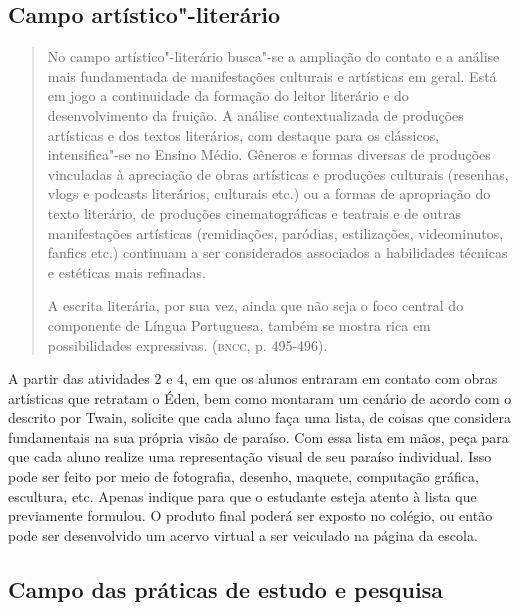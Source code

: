 \documentclass{extarticle}
\begin{document}
\subsection{Campo artístico"-literário}

\begin{quote}
No campo artístico"-literário busca"-se a ampliação do contato e a
análise mais fundamentada de manifestações culturais e artísticas em
geral. Está em jogo a continuidade da formação do leitor literário e do
desenvolvimento da fruição. A análise contextualizada de produções
artísticas e dos textos literários, com destaque para os clássicos,
intensifica"-se no Ensino Médio. Gêneros e formas diversas de produções
vinculadas à apreciação de obras artísticas e produções culturais
(resenhas, vlogs e podcasts literários, culturais etc.) ou a formas de
apropriação do texto literário, de produções cinematográficas e teatrais
e de outras manifestações artísticas (remidiações, paródias,
estilizações, videominutos, fanfics etc.) continuam a ser considerados
associados a habilidades técnicas e estéticas mais refinadas.

A escrita literária, por sua vez, ainda que não seja o foco central do
componente de Língua Portuguesa, também se mostra rica em possibilidades
expressivas. (\textsc{bncc}, p. 495-496).
\end{quote}

A partir das atividades 2 e 4, em que os alunos entraram em contato
com obras artísticas que retratam o Éden, bem como montaram um cenário
de acordo com o descrito por Twain, solicite que cada aluno faça uma
lista, de coisas que considera fundamentais na sua própria visão de
paraíso. Com essa lista em mãos, peça para que cada aluno realize uma
representação visual de seu paraíso individual. Isso pode ser feito
por meio de fotografia, desenho, maquete, computação gráfica,
escultura, etc. Apenas indique para que o estudante esteja atento à
lista que previamente formulou. O produto final poderá ser exposto no
colégio, ou então pode ser desenvolvido um acervo virtual a ser
veiculado na página da escola.

\subsection{Campo das práticas de estudo e pesquisa}
\end{document}
